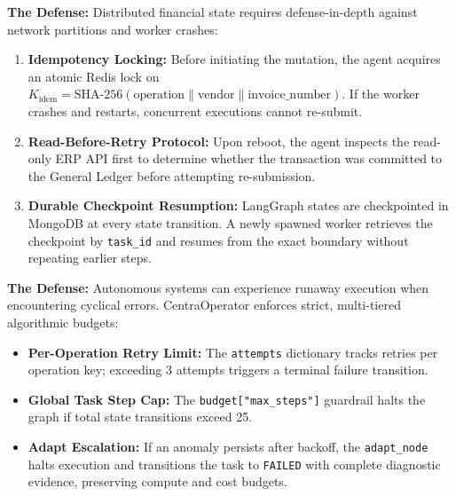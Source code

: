 \begin{qaquerybox}
\textbf{The Defense:}
Distributed financial state requires defense-in-depth against network partitions and worker crashes:
\begin{enumerate}
  \item \textbf{Idempotency Locking:} Before initiating the mutation, the agent acquires an atomic Redis lock on $K_{\text{idem}} = \text{SHA-256}(\text{operation} \parallel \text{vendor} \parallel \text{invoice\_number})$. If the worker crashes and restarts, concurrent executions cannot re-submit.
  \item \textbf{Read-Before-Retry Protocol:} Upon reboot, the agent inspects the read-only ERP API first to determine whether the transaction was committed to the General Ledger before attempting re-submission.
  \item \textbf{Durable Checkpoint Resumption:} LangGraph states are checkpointed in MongoDB at every state transition. A newly spawned worker retrieves the checkpoint by \texttt{task\_id} and resumes from the exact boundary without repeating earlier steps.
\end{enumerate}
\end{qaquerybox}

\begin{qaquerybox}
\textbf{The Defense:}
Autonomous systems can experience runaway execution when encountering cyclical errors. CentraOperator enforces strict, multi-tiered algorithmic budgets:
\begin{itemize}
  \item \textbf{Per-Operation Retry Limit:} The \texttt{attempts} dictionary tracks retries per operation key; exceeding 3 attempts triggers a terminal failure transition.
  \item \textbf{Global Task Step Cap:} The \texttt{budget["max\_steps"]} guardrail halts the graph if total state transitions exceed 25.
  \item \textbf{Adapt Escalation:} If an anomaly persists after backoff, the \texttt{adapt\_node} halts execution and transitions the task to \texttt{FAILED} with complete diagnostic evidence, preserving compute and cost budgets.
\end{itemize}
\end{qaquerybox}

